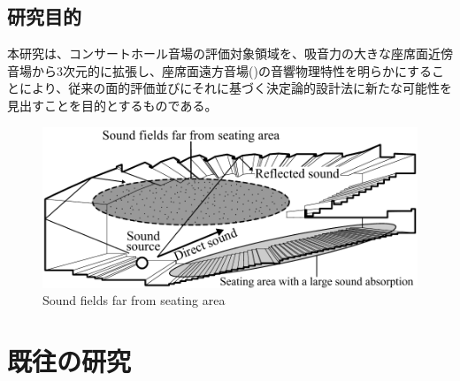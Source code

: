 \subsection{研究目的}
本研究は、コンサートホール音場の評価対象領域を、吸音力の大きな座席面近傍音場から3次元的に拡張し、座席面遠方音場()の音響物理特性を明らかにすることにより、従来の面的評価並びにそれに基づく決定論的設計法に新たな可能性を見出すことを目的とするものである。
\begin{figure}[htbp]
    \centering
    \includegraphics[keepaspectratio,scale=0.8]{01_att/zasekimen_enpo_English.pdf}
    \caption{\hspace{1mm}Sound fields far from seating area}
    \label{fig:座席面遠方音場}
\end{figure}

\newpage
\section{既往の研究}

